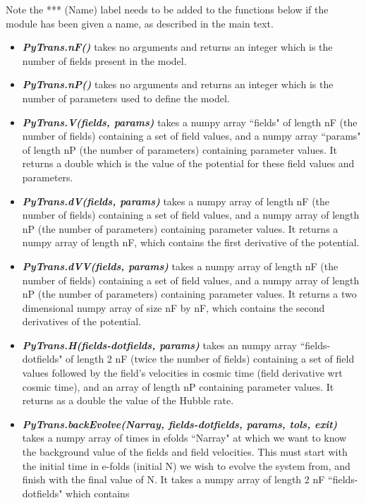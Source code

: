 \documentclass[10pt,
amsmath,amssymb,
aps,prd,nofootinbib,eqsecnum,a4paper]{revtex4}
\begin{document}
Note the *** (Name) label needs to be added to the functions below if the module has been given a name, as described in the main text.

\begin{itemize}
\item    {\it \bf PyTrans.nF()} takes no arguments and returns an integer which is the number of fields present in the model.  
\item    {\it \bf PyTrans.nP()} takes no arguments and returns an integer which is the number of parameters used to define the model.
\item    {\it \bf PyTrans.V(fields, params)} takes a numpy array ``fields" of length nF (the number of fields) containing a set 
    of field values, and a numpy array ``params" of length nP (the number of parameters) containing parameter values. 
    It returns a double which is the value of the potential for these field values and parameters.
\item  {\it \bf PyTrans.dV(fields, params)} takes a numpy array of length nF (the number of fields) containing a set 
    of field values, and a numpy array of length nP (the number of parameters) containing parameter values. It returns a numpy array of length nF, which contains the first derivative of the potential.
\item  {\it \bf PyTrans.dVV(fields, params)} takes a numpy array of length nF (the number of fields) containing a set 
    of field values, and a numpy array of length nP (the number of parameters) containing parameter values. It returns a two dimensional 
    numpy array of size nF by nF, which   
    contains the second derivatives of the potential.
\item  {\it \bf PyTrans.H(fields-dotfields, params)} takes an numpy array ``fields-dotfields" of length 2 nF (twice the number of 
    fields) containing a set of field values followed by the field's velocities in cosmic time 
    (field derivative wrt cosmic time), and an array of length nP  containing parameter values.
    It returns as a double the value of the Hubble rate.
\item  {\it \bf PyTrans.backEvolve(Narray, fields-dotfields, params, tols, exit)} takes a numpy array of times in efolds ``Narray"
    at which we want to know the background value of the fields and field velocities. 
    This must start with the initial time in e-folds (initial N) we wish to evolve the system from, and finish with the 
    final value of N. It takes  a numpy array of length 2 nF ``fields-dotfields" which contains 

\end{itemize}
\end{document}
